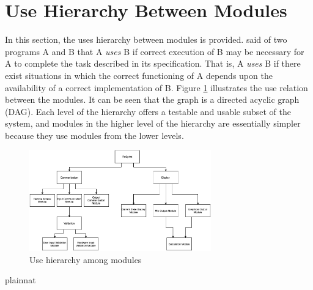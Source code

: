 \documentclass[12pt, titlepage]{article}
\begin{document}
\section{Use Hierarchy Between Modules} \label{SecUse}

In this section, the uses hierarchy between modules is
provided. \citet{Parnas1978} said of two programs A and B that A {\em uses} B if
correct execution of B may be necessary for A to complete the task described in
its specification. That is, A {\em uses} B if there exist situations in which
the correct functioning of A depends upon the availability of a correct
implementation of B.  Figure \ref{FigUH} illustrates the use relation between
the modules. It can be seen that the graph is a directed acyclic graph
(DAG). Each level of the hierarchy offers a testable and usable subset of the
system, and modules in the higher level of the hierarchy are essentially simpler
because they use modules from the lower levels.


\begin{figure}[H]
\centering
\includegraphics[width=0.7\textwidth]{UsesHierarchy.png}
\caption{Use hierarchy among modules}
\label{FigUH}
\end{figure}


 {plainnat}


\newpage{}
\end{document}
